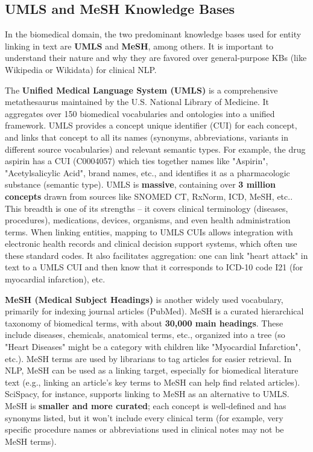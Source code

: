 \subsection{UMLS and MeSH Knowledge Bases}

In the biomedical domain, the two predominant knowledge bases used for entity linking in text are \textbf{UMLS} and \textbf{MeSH}, among others. It is important to understand their nature and why they are favored over general-purpose KBs (like Wikipedia or Wikidata) for clinical NLP.

The \textbf{Unified Medical Language System (UMLS)} is a comprehensive metathesaurus maintained by the U.S. National Library of Medicine. It aggregates over 150 biomedical vocabularies and ontologies into a unified framework. UMLS provides a concept unique identifier (CUI) for each concept, and links that concept to all its names (synonyms, abbreviations, variants in different source vocabularies) and relevant semantic types. For example, the drug aspirin has a CUI (C0004057) which ties together names like "Aspirin", "Acetylsalicylic Acid", brand names, etc., and identifies it as a pharmacologic substance (semantic type). UMLS is \textbf{massive}, containing over \textbf{3 million concepts} drawn from sources like SNOMED CT, RxNorm, ICD, MeSH, etc.. This breadth is one of its strengths – it covers clinical terminology (diseases, procedures), medications, devices, organisms, and even health administration terms. When linking entities, mapping to UMLS CUIs allows integration with electronic health records and clinical decision support systems, which often use these standard codes. It also facilitates aggregation: one can link "heart attack" in text to a UMLS CUI and then know that it corresponds to ICD-10 code I21 (for myocardial infarction), etc.

\textbf{MeSH (Medical Subject Headings)} is another widely used vocabulary, primarily for indexing journal articles (PubMed). MeSH is a curated hierarchical taxonomy of biomedical terms, with about \textbf{30,000 main headings}. These include diseases, chemicals, anatomical terms, etc., organized into a tree (so "Heart Diseases" might be a category with children like "Myocardial Infarction", etc.). MeSH terms are used by librarians to tag articles for easier retrieval. In NLP, MeSH can be used as a linking target, especially for biomedical literature text (e.g., linking an article's key terms to MeSH can help find related articles). SciSpacy, for instance, supports linking to MeSH as an alternative to UMLS. MeSH is \textbf{smaller and more curated}; each concept is well-defined and has synonyms listed, but it won't include every clinical term (for example, very specific procedure names or abbreviations used in clinical notes may not be MeSH terms).

